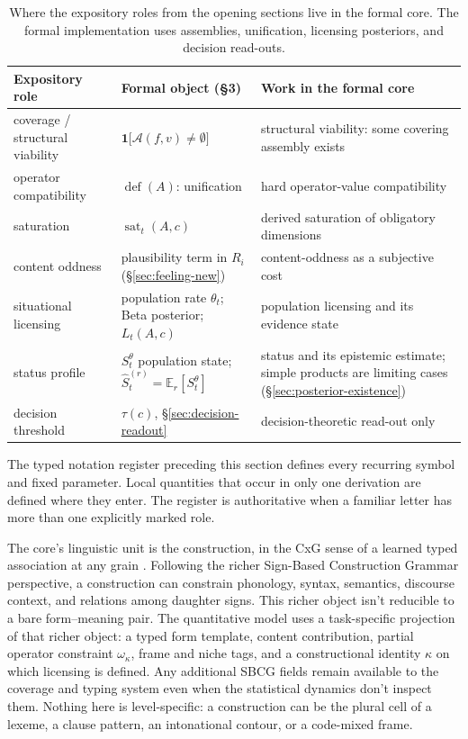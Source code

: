 \begin{table}[htbp]
\centering
\small
\begin{tabular}{@{}>{\raggedright\arraybackslash}p{}
  >{\raggedright\arraybackslash}p{}
  >{\raggedright\arraybackslash}p{}@{}}
\toprule
Expository role & Formal object (\S3) & Work in the formal core \\
\midrule
coverage / structural viability & $\mathbf{1}\bigl[\mathcal{A}(f,v)\neq\emptyset\bigr]$ &
  structural viability: some covering assembly exists \\
operator compatibility & $\operatorname{def}(A)$: unification &
  hard operator-value compatibility \\
saturation & $\operatorname{sat}_t(A,c)$ &
  derived saturation of obligatory dimensions \\
content oddness & plausibility term in $R_i$ (\S\ref{sec:feeling-new}) &
  content-oddness as a subjective cost \\
situational licensing & population rate $\theta_t$; Beta posterior; $L_t(A,c)$ &
  population licensing and its evidence state \\
status profile & $S_t^{\theta}$ population state;
  $\widehat{S}^{(r)}_t=\mathbb{E}_r[S_t^{\theta}]$ &
  status and its epistemic estimate; simple products are limiting cases
  (\S\ref{sec:posterior-existence}) \\
decision threshold & $\tau(c)$, \S\ref{sec:decision-readout} & decision-theoretic read-out only \\
\bottomrule
\end{tabular}
\caption{Where the expository roles from the opening sections live in the formal core. The formal implementation uses assemblies, unification, licensing posteriors, and decision read-outs.}
\label{tab:notation-bridge}
\end{table}

The typed notation register preceding this section defines every recurring
symbol and fixed parameter. Local quantities that occur in only one derivation
are defined where they enter. The register is authoritative when a familiar
letter has more than one explicitly marked role.

The core's linguistic unit is the construction, in the CxG sense of a learned
typed association at any grain \citep{fillmore1988,
goldberg1995constructions,sag2012sign}. Following the richer Sign-Based
Construction Grammar perspective, a construction can constrain phonology,
syntax, semantics, discourse context, and relations among daughter signs. This
richer object isn't reducible to a bare form--meaning pair. The quantitative model
uses a task-specific projection of that richer object: a typed form template,
content contribution, partial operator constraint $\omega_\kappa$, frame and
niche tags, and a constructional identity $\kappa$ on which licensing is
defined. Any additional SBCG fields remain available to the coverage and typing
system even when the statistical dynamics don't inspect them. Nothing here is
level-specific: a construction can be the plural cell of a lexeme, a clause
pattern, an intonational contour, or a code-mixed frame.

